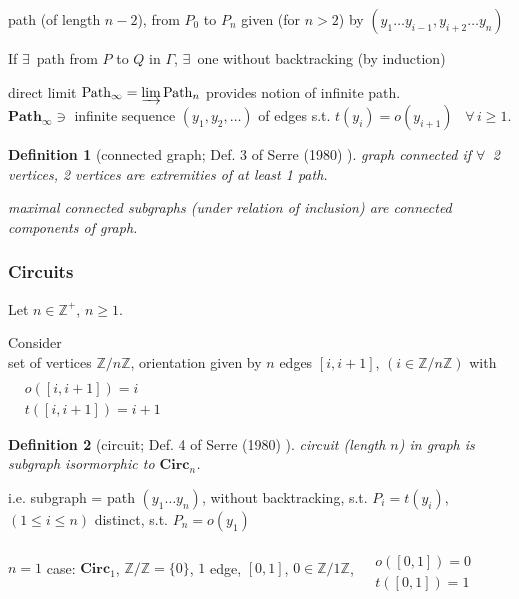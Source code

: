 \documentclass[10pt]{amsart}
\newtheorem{definition}{Definition}
\begin{document}
\begin{multicols*}{2}
path (of length $n-2$), from $P_0$ to $P_n$ given (for $n>2$) by $(y_1\dots y_{i-1}, y_{i+2}\dots y_n)$  

If $\exists \, $ path from $P$ to $Q$ in $\Gamma$, $\exists \, $ one without backtracking (by induction)  

direct limit $\mathbf{\text{Path}}_{\infty} = \varinjlim \mathbf{\text{Path}}_n$ provides notion of infinite path.  \\
$\mathbf{\text{Path}}_{\infty} \ni $ infinite sequence $(y_1,y_2 , \dots)$ of edges s.t. $t(y_i) = o(y_{i+1})$ \, $\forall \, i \geq 1$.  


\begin{definition}[connected graph; Def. 3 of Serre (1980) \cite{Serr1980}]
	graph connected if $\forall \, $ 2 vertices, 2 vertices are extremities of at least 1 path.  
	
	maximal connected subgraphs (under relation of inclusion) are \emph{connected components} of graph.  
\end{definition}

\subsubsection{Circuits}  

Let $n\in \mathbb{Z}^+$, $n\geq 1$.  

Consider \\
set of vertices $\mathbb{Z}/n\mathbb{Z}$, orientation given by $n$ edges $[i,i+1]$, $(i\in \mathbb{Z}/n\mathbb{Z})$ with $\begin{aligned} & \quad \\
 & o([i,i+1]) = i \\
 & t([i,i+1]) = i+1 \end{aligned}$

\begin{definition}[circuit; Def. 4 of Serre (1980) \cite{Serr1980}]
	circuit (length $n$) in graph is subgraph isormorphic to $\mathbf{\text{Circ}}_n$.  
\end{definition}
i.e. subgraph = path $(y_1\dots y_n)$, without backtracking, s.t. $P_i = t(y_i)$, \, $(1\leq i \leq n)$ distinct, s.t. $P_n = o(y_1)$

$n=1$ case: $\mathbf{\text{Circ}}_1$, $\mathbb{Z}/\mathbb{Z} = \lbrace 0 \rbrace$, $1$ edge, $[0,1]$, $0 \in \mathbb{Z}/1\mathbb{Z}$, $\begin{aligned} & \quad \\
	& o([0,1]) = 0 \\
	& t([0,1]) = 1 \end{aligned}$  
	

\end{multicols*}
\end{document}
